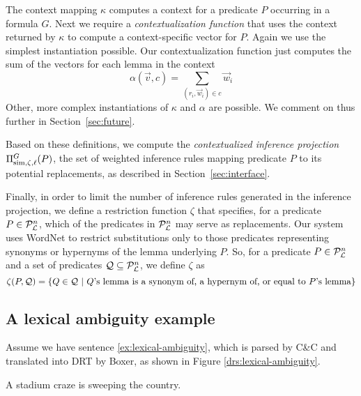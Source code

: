 The context mapping $\kappa$ computes a context for a predicate $P$
occurring in a formula $G$. Next we require a 
\textit{contextualization function} that uses the context returned by
$\kappa$ to compute a context-specific vector for $P$. Again we use
the simplest instantiation possible. Our contextualization
function just computes the sum of the vectors for each lemma in the context \[ \alpha(\vec v,
c) = \sum_{(r_i, \vec w_i) \in c} \vec w_i \]  Other, more complex
instantiations of $\kappa$ and $\alpha$ are possible. We comment on
thus further in Section~\ref{sec:future}. 

Based on these definitions, we compute the \textit{contextualized
inference projection} $\Pi^G_{\mathrm{sim},\zeta,\ell}(P)$, the set of weighted
inference rules mapping predicate $P$ to its potential replacements,
as described in Section~\ref{sec:interface}.

Finally, in order to limit the number of inference rules generated in the
inference projection, we define a restriction function $\zeta$ that specifies,
for a predicate $P \in {\cal{P}}_{{\cal{L}}}^n$, which of the predicates in
${\cal{P}}_{{\cal{L}}}^n$ may serve as replacements.  Our system uses WordNet
\citep{miller:wordnet2009} to restrict substitutions only to those predicates
representing synonyms or hypernyms of the lemma underlying $P$.  So, for a
predicate $P \in {\cal{P}}_{{\cal{L}}}^n$ and a set of predicates ${\cal Q}
\subseteq {\cal{P}}_{{\cal{L}}}^n$, we define $\zeta$ as \[ \zeta(P,{\cal Q}) = \{
Q \in {\cal Q} ~|~ Q\text{'s lemma is a synonym of, a hypernym of, or equal to
}P\text{'s lemma} \} \]


\subsection*{A lexical ambiguity example}

Assume we have sentence \eqref{ex:lexical-ambiguity}, which is parsed by C\&C
and translated into DRT by Boxer, as shown in Figure
\ref{drs:lexical-ambiguity}.

\begin{covex}\label{ex:lexical-ambiguity}
  A stadium craze is sweeping the country.
\end{covex}

